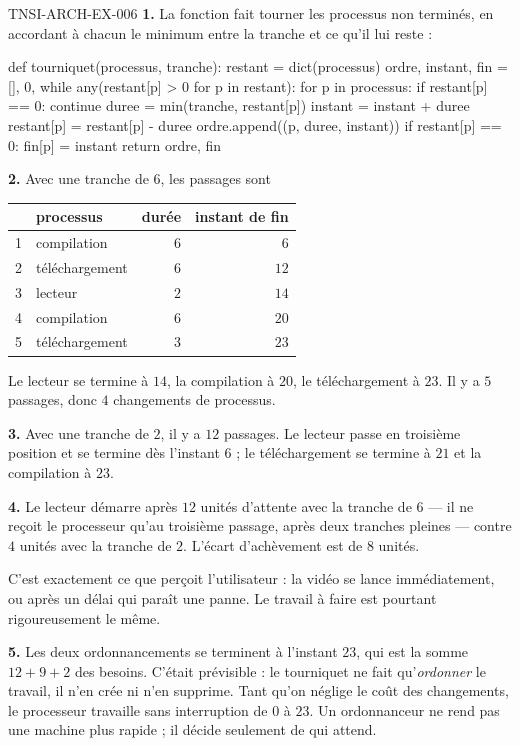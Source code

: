 \begin{corrige}{TNSI-ARCH-EX-006}
\textbf{1.} La fonction fait tourner les processus non terminés, en accordant à
chacun le minimum entre la tranche et ce qu'il lui reste :
\begin{python}
def tourniquet(processus, tranche):
    restant = dict(processus)
    ordre, instant, fin = [], 0, {}
    while any(restant[p] > 0 for p in restant):
        for p in processus:
            if restant[p] == 0:
                continue
            duree = min(tranche, restant[p])
            instant = instant + duree
            restant[p] = restant[p] - duree
            ordre.append((p, duree, instant))
            if restant[p] == 0:
                fin[p] = instant
    return ordre, fin
\end{python}

\textbf{2.} Avec une tranche de $6$, les passages sont
\begin{center}
\begin{tabular}{llrr}
\hline
 & processus & durée & instant de fin \\
\hline
1 & compilation & $6$ & $6$ \\
2 & téléchargement & $6$ & $12$ \\
3 & lecteur & $2$ & $14$ \\
4 & compilation & $6$ & $20$ \\
5 & téléchargement & $3$ & $23$ \\
\hline
\end{tabular}
\end{center}
Le lecteur se termine à $14$, la compilation à $20$, le téléchargement à $23$.
Il y a $5$ passages, donc $4$ changements de processus.

\textbf{3.} Avec une tranche de $2$, il y a $12$ passages. Le lecteur passe en
troisième position et se termine dès l'instant $6$ ; le téléchargement se
termine à $21$ et la compilation à $23$.

\textbf{4.} Le lecteur démarre après $12$ unités d'attente avec la tranche de
$6$ — il ne reçoit le processeur qu'au troisième passage, après deux tranches
pleines — contre $4$ unités avec la tranche de $2$. L'écart d'achèvement est de
$8$ unités.

C'est exactement ce que perçoit l'utilisateur : la vidéo se lance
immédiatement, ou après un délai qui paraît une panne. Le travail à faire est
pourtant rigoureusement le même.

\textbf{5.} Les deux ordonnancements se terminent à l'instant $23$, qui est la
somme $12+9+2$ des besoins. C'était prévisible : le tourniquet ne fait
qu'\emph{ordonner} le travail, il n'en crée ni n'en supprime. Tant qu'on néglige
le coût des changements, le processeur travaille sans interruption de $0$ à $23$.
Un ordonnanceur ne rend pas une machine plus rapide ; il décide seulement de
qui attend.


\end{corrige}
